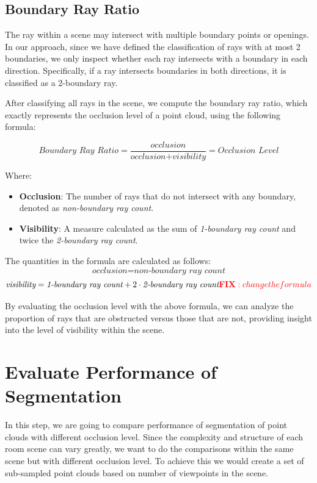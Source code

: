 \documentclass[11pt, a4paper,oneside,chapterprefix=false]{scrbook}
\newcommand{\FIXME}[1]{{\color{RED}{\textbf{FIX}: #1}}}
\begin{document}
\subsection{Boundary Ray Ratio}

The ray within a scene may intersect with multiple boundary points or openings. In our approach, since we have defined the classification of rays with at most 2 boundaries, we only inspect whether each ray intersects with a boundary in each direction. Specifically, if a ray intersects boundaries in both directions, it is classified as a 2-boundary ray.

\vspace{10pt}

After classifying all rays in the scene, we compute the boundary ray ratio, which exactly represents the occlusion level of a point cloud, using the following formula:

\[
\textit{{Boundary Ray Ratio}} = \frac{{\textit{{occlusion}}}}{{\textit{{occlusion}} + \textit{{visibility}}}} = \textit{{Occlusion Level}}
\]

Where:
\begin{itemize}
    \item \textbf{{Occlusion}}: The number of rays that do not intersect with any boundary, denoted as \textit{{non-boundary ray count}}.
    \item \textbf{{Visibility}}: A measure calculated as the sum of \textit{{1-boundary ray count}} and twice the \textit{{2-boundary ray count}}.
\end{itemize}

The quantities in the formula are calculated as follows:
\[
    \textit{{occlusion}} = \textit{{non-boundary ray count}}
\]
\[
    \textit{{visibility}} = \textit{{1-boundary ray count}} + 2 \cdot \textit{{2-boundary ray count}} \FIXME{change the formula}
\]

By evaluating the occlusion level with the above formula, we can analyze the proportion of rays that are obstructed versus those that are not, providing insight into the level of visibility within the scene.


\section{Evaluate Performance of Segmentation} \label{evaluate performance of segmentation}

In this step, we are going to compare performance of segmentation of point clouds with different occlusion level. Since the complexity and structure of each room scene can vary greatly, we want to do the comparisons within the same scene but with different occlusion level. To achieve this we would create a set of sub-sampled point clouds based on number of viewpoints in the scene.
\end{document}
